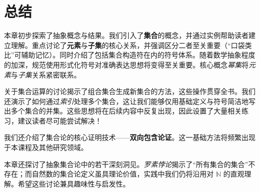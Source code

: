 \section{总结}

本章初步探索了抽象概念与结果。我们引入了\textbf{集合}的概念，并通过实例帮助读者建立理解。重点讨论了\textbf{元素}与\textbf{子集}的核心关系，并强调区分二者至关重要（``口袋类比''可辅助记忆）。同时介绍了包括集合构造符在内的符号体系。随着数学抽象程度的加深，规范使用形式化符号对准确表达思想将变得至关重要。核心概念\emph{幂集}将\emph{元素}与\emph{子集}关系紧密联系。

关于集合运算的讨论揭示了组合集合生成新集合的方法，这些操作贯穿全书。我们还演示了如何通过\emph{索引}处理多个集合，这让我们能够仅用基础定义与符号简洁地写出多个集合的并集。这些思想将在后续内容中反复出现，因此设置了大量相关练习，建议读者尽可能尝试解决！

我们还介绍了集合论的核心证明技术——\textbf{双向包含论证}。这一基础方法将频繁出现于本课程及其他研究领域。

本章还探讨了抽象集合论中的若干深刻洞见。\emph{罗素悖论}揭示了``所有集合的集合''不存在；而自然数的集合论定义虽具理论价值，实践中我们仍将沿用对 $\mathbb{N}$ 的直观理解。希望这些讨论兼具趣味性与启发性。
